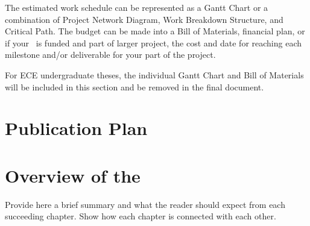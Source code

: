 The estimated work schedule can be represented as a Gantt Chart or a combination of Project Network Diagram, Work Breakdown Structure, and Critical Path.  The budget can be made into a Bill of Materials, financial plan, or if your \documentType \ is funded and part of larger project, the cost and date for reaching each milestone and/or deliverable for your part of the project.

For ECE undergraduate theses, the individual Gantt Chart and Bill of Materials will be included in this section and be removed in the final document.

\graytx{\blindtext}

\ifPhD
\section{Publication Plan}
\graytx{\blindtext}
\fi

\fi


\section{Overview of the \documentType}

Provide here a brief summary and what the reader should expect from each succeeding chapter.  Show how each chapter is connected with each other.

